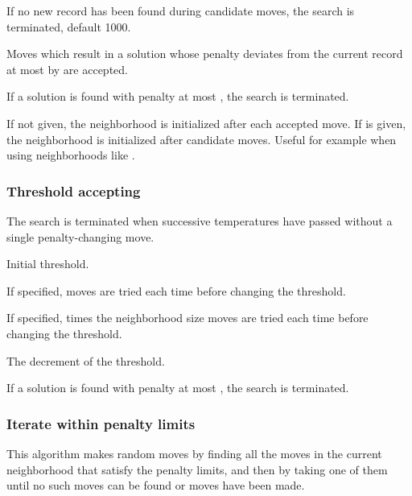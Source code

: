 \documentclass[12pt,a4paper]{article}
\begin{document}
\begin{owndescription}
\item[\Var{frozen}] If no new record has been found during
   candidate moves, the search is terminated, default
  1000.
\item[\Var{deviation}] Moves which result in a solution whose penalty
  deviates from the current record at most by  are
  accepted.
\item[\Var{endlimit}] If a solution is found with penalty at most
  , the search is terminated.
\item[\Var{specialrecord}] If not given, the neighborhood is
  initialized after each accepted move. If  is
  given, the neighborhood is initialized after 
  candidate moves. Useful for example when using neighborhoods like
  .
\end{owndescription}

\subsubsection{Threshold accepting}
\label{sec:threshold}

\begin{owndescription}
\item[\Var{frozen}] The search is terminated when 
  successive temperatures have passed without a single
  penalty-changing move.
\item[\Var{threshold}] Initial threshold.
\item[\Var{L}] If specified,  moves are tried each time before
  changing the threshold.
\item[\Var{LF}] If specified,  times the neighborhood size
  moves are tried each time before changing the threshold.
\item[\Var{down}] The decrement of the threshold.
\item[\Var{endlimit}] If a solution is found with penalty at most
  , the search is terminated.
\end{owndescription}

\subsubsection{Iterate within penalty limits}
\label{sec:iterpen}

This algorithm makes random moves by finding all the moves in the
current neighborhood that satisfy the penalty limits, and then by
taking one of them until no such moves can be found or 
moves have been made.
\end{document}
